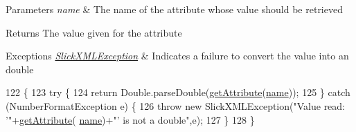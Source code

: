 \begin{DoxyParams}{Parameters}
{\em name} & The name of the attribute whose value should be retrieved \\
\hline
\end{DoxyParams}
\begin{DoxyReturn}{Returns}
The value given for the attribute 
\end{DoxyReturn}

\begin{DoxyExceptions}{Exceptions}
{\em \mbox{\hyperlink{classorg_1_1newdawn_1_1slick_1_1util_1_1xml_1_1_slick_x_m_l_exception}{Slick\+X\+M\+L\+Exception}}} & Indicates a failure to convert the value into an double \\
\hline
\end{DoxyExceptions}

\begin{DoxyCode}
122                                                                            \{
123         \textcolor{keywordflow}{try} \{
124             \textcolor{keywordflow}{return} Double.parseDouble(\mbox{\hyperlink{classorg_1_1newdawn_1_1slick_1_1util_1_1xml_1_1_x_m_l_element_a49543d209f2f2709c8e7a88fac034c69}{getAttribute}}(\mbox{\hyperlink{classorg_1_1newdawn_1_1slick_1_1util_1_1xml_1_1_x_m_l_element_aa96123a88e2614952c4d3d1a4207560a}{name}}));
125         \} \textcolor{keywordflow}{catch} (NumberFormatException e) \{
126             \textcolor{keywordflow}{throw} \textcolor{keyword}{new} SlickXMLException(\textcolor{stringliteral}{"Value read: '"}+\mbox{\hyperlink{classorg_1_1newdawn_1_1slick_1_1util_1_1xml_1_1_x_m_l_element_a49543d209f2f2709c8e7a88fac034c69}{getAttribute}}(
      \mbox{\hyperlink{classorg_1_1newdawn_1_1slick_1_1util_1_1xml_1_1_x_m_l_element_aa96123a88e2614952c4d3d1a4207560a}{name}})+\textcolor{stringliteral}{"' is not a double"},e);
127         \}
128     \}
\end{DoxyCode}
\mbox{\label{classorg_1_1newdawn_1_1slick_1_1util_1_1xml_1_1_x_m_l_element_a8cafc860482d907877f6f5063596c29f}} 
